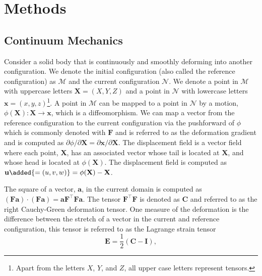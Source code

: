 \section{Methods}
\subsection{Continuum Mechanics}
Consider a solid body that is continuously and smoothly deforming into another configuration. We denote the initial configuration (also called the reference configuration) as $\mathcal{M}$ and the current configuration $\mathcal{N}$. We denote a point in $\mathcal{M}$ with uppercase letters $\mathbf{X} = (X, Y, Z)$ and a point in $\mathcal{N}$ with lowercase letters $\mathbf{x} = (x, y, z)$\footnote{Apart from the letters $X$, $Y$, and $Z$, all upper case letters represent tensors.}. A point in $\mathcal{M}$ can be mapped to a point in $\mathcal{N}$ by a motion, $\phi(\mathbf{X}): \mathbf{X} \rightarrow \mathbf{x}$, which is a diffeomorphism. We can map a vector from the reference configuration to the current configuration via the pushforward of $\phi$ which is commonly denoted with $\mathbf{F}$ and is referred to as the deformation gradient and is computed as $\partial\phi/\partial\mathbf{X} = \partial\mathbf{x}/\partial\mathbf{X}$. The displacement field is a vector field where each point, $\mathbf{X}$, has an associated  vector whose tail is located at $\mathbf{X}$, and whose head is located at $\phi(\mathbf{X})$. The displacement field is computed as $\mathbf{u}\added{ = (u, v, w)} = \phi(\mathbf{X}) - \mathbf{X}$. \par 
The square of a vector, $\mathbf{a}$, in the current domain is computed as $(\mathbf{Fa})\cdot(\mathbf{Fa}) = \mathbf{a}\mathbf{F}^\top\mathbf{F}\mathbf{a}$. The tensor $\mathbf{F}^\top\mathbf{F}$ is denoted as $\mathbf{C}$ and referred to as the right Cauchy-Green deformation tensor. One measure of the deformation is the difference between the stretch of a vector in the current and reference configuration, this tensor is referred to as the Lagrange strain tensor 
\begin{equation*}
    \mathbf{E} = \frac{1}{2}\left(\mathbf{C} - \mathbf{I}\right),
\end{equation*}
